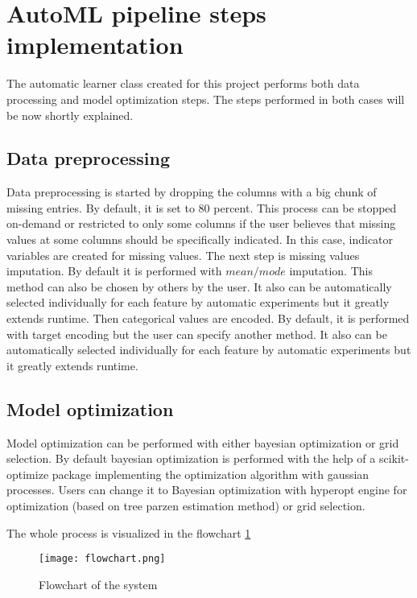 \documentclass[a4paper,twoside,12pt]{book}
\begin{document}
\section{AutoML pipeline steps implementation}
The automatic learner class created for this project performs both data processing and model optimization steps. The steps performed in both cases will be now shortly explained.
\subsection{Data preprocessing}
Data preprocessing is started by dropping the columns with a big chunk of missing entries. By default, it is set to 80 percent. This process can be stopped on-demand or restricted to only some columns if the user believes that missing values at some columns should be specifically indicated. In this case, indicator variables are created for missing values.
The next step is missing values imputation. By default it is performed with $mean/mode$ imputation. This method can also be chosen by others by the user. It also can be automatically selected individually for each feature by automatic experiments but it greatly extends runtime.
Then categorical values are encoded. By default, it is performed with target encoding but the user can specify another method. It also can be automatically selected individually for each feature by automatic experiments but it greatly extends runtime.

\subsection{Model optimization}

Model optimization can be performed with either bayesian optimization or grid selection. By default bayesian optimization is performed with the help of a scikit-optimize package implementing the optimization algorithm with gaussian processes. 
Users can change it to Bayesian optimization with hyperopt engine for optimization (based on tree parzen estimation method) or grid selection.



The whole process is visualized in the flowchart \ref{fig:flowchart}


\begin{figure}[!htb]
    \centering
    \texttt{[image: flowchart.png]}
    \caption{Flowchart of the system}
    \label{fig:flowchart}
\end{figure}
\end{document}
